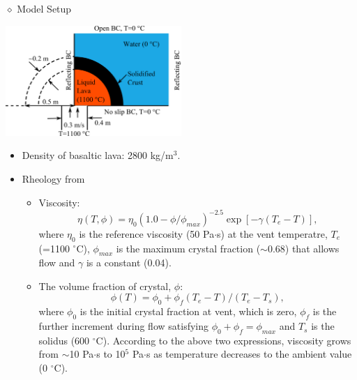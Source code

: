 \documentclass[aguposter,landscape]{baposter}
\begin{document}
\begin{poster}
{{\large $\diamond$ Model Setup}\\
\vspace{-2.0em}
\begin{center}
   \includegraphics[width=0.5\textwidth]{Gale_model_setting.png} 
\end{center}
\begin{minipage}[t]{1.0\linewidth}
   \noindent
   \vspace{-3.0em}
   \scriptsize
   \begin{multicols}{2}
   \begin{itemize}[leftmargin=1.5em]\setlength{\itemsep}{0em}
      \item Density of basaltic lava: 2800 kg/m$^{3}$. 
      \item Rheology from \citep{Griffiths2000}
      \vspace{-1em}
      \begin{itemize}[leftmargin=0.5em] %
         \item Viscosity:
         \setlength{\abovedisplayskip}{0.2em}
         \setlength{\belowdisplayskip}{0.2em}
         \begin{equation*}
            \eta(T,\phi) = \eta_{0} (1.0-\phi/\phi_{max})^{-2.5}\exp[ -\gamma(T_{e}-T) ],
            \label{eq:basalt viscosity}
         \end{equation*}
         where $\eta_{0}$ is the reference viscosity (50 Pa$\cdot$s) at the vent temperatre, $T_{e}$ (=1100 $^{\circ}$C), $\phi_{max}$ is the maximum crystal fraction ($\sim$0.68) that allows flow and $\gamma$ is a constant (0.04). 

       \item The volume fraction of crystal, $\phi$:
       \begin{equation*}
          \phi(T) = \phi_{0} + \phi_{f}(T_{e}-T)/(T_{e}-T_{s}),
       \end{equation*}
       where $\phi_{0}$ is the initial crystal fraction at vent, which is zero, $\phi_{f}$ is the further increment during flow satisfying $\phi_{0}+\phi_{f} = \phi_{max}$ and $T_{s}$ is the solidus (600 $^{\circ}$C). According to the above two expressions, viscosity grows from $\sim$10 Pa$\cdot$s to 10$^{5}$ Pa$\cdot$s as temperature decreases to the ambient value (0 $^{\circ}$C). 


\end{itemize}
\end{itemize}
\end{multicols}
\end{minipage}}
\end{poster}
\end{document}
